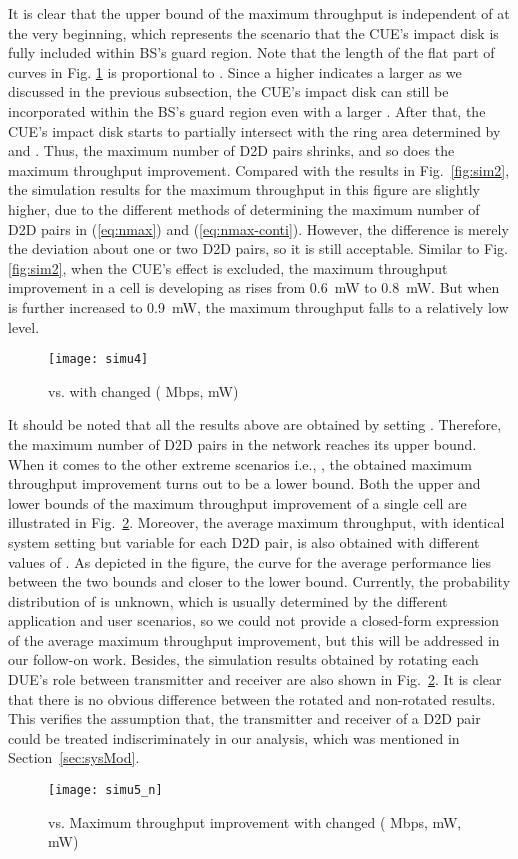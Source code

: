 \documentclass[journal, 10pt]{IEEEtran}
\begin{document}
It is clear that the upper bound of the maximum throughput is
independent of  at the very beginning, which
represents the scenario that the CUE's impact disk is fully included
within BS's guard region. Note that the length of the flat part of
curves in Fig. \ref{fig:sim4} is proportional to . Since
a higher  indicates a larger  as we
discussed in the previous subsection, the CUE's impact disk can
still be incorporated within the BS's guard region even with a larger
. After that, the CUE's impact disk starts to
partially intersect with the ring area determined by 
and . Thus, the maximum number of D2D pairs shrinks, and
so does the maximum throughput improvement. Compared with the results
in Fig.~\ref{fig:sim2}, the simulation results for the maximum
throughput in this figure are slightly higher, due to the different
methods of determining the maximum number of D2D pairs in
(\ref{eq:nmax}) and (\ref{eq:nmax-conti}). However, the difference is
merely the deviation about one or two D2D pairs, so it is still
acceptable. 
Similar to Fig. \ref{fig:sim2}, when the CUE's effect is excluded, the
maximum throughput improvement in a cell is developing as
 rises from 0.6~mW to 0.8~mW. But when  is further increased to 0.9~mW, the maximum throughput falls to a
relatively low level.  
\begin{figure}[!htb]
\centering \texttt{[image: simu4]} \caption{ vs.  with changed  ( Mbps, 
 mW)} \label{fig:sim4}
\end{figure}

It should be noted that all the results above are obtained by setting
. Therefore, the maximum number of D2D pairs
in the network reaches its upper bound. When it comes to the other
extreme scenarios i.e., , the obtained
maximum throughput improvement turns out to be a lower bound. Both the
upper and lower bounds of the maximum throughput improvement of a
single cell are illustrated in Fig.~\ref{fig:sim5}. Moreover, the
average maximum throughput, with identical system setting but variable
 for each D2D pair, is also obtained with different
values of . As depicted in the figure, the curve for
the average performance lies between the two bounds and closer to the
lower bound. Currently, the probability distribution of
 is unknown, which is usually determined by the
different application and user scenarios, so we could not provide a
closed-form expression of the average maximum throughput improvement, but this
will be addressed in our follow-on work. Besides, the 
simulation results obtained by rotating each DUE's role between 
transmitter and receiver are also shown in Fig.~\ref{fig:sim5}. It is 
clear that there is no obvious difference between the rotated and 
non-rotated results. This verifies the assumption that, the transmitter and 
receiver of a D2D pair could be treated indiscriminately in our analysis, 
which was mentioned in Section~\ref{sec:sysMod}.
\begin{figure}[!htb]
\centering \texttt{[image: simu5\_n]} \caption{ vs. Maximum throughput improvement with changed 
 ( Mbps,  mW, 
 mW)}\label{fig:sim5} 
\end{figure}
\end{document}
